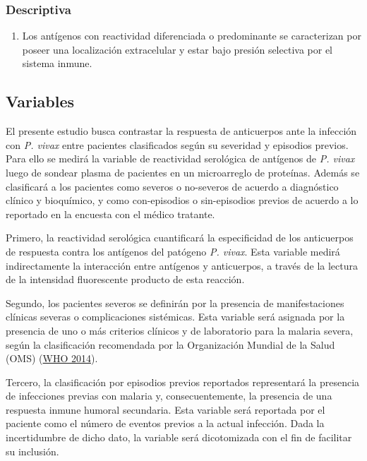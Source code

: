 \documentclass[
  a4paper]{article}
\providecommand{\tightlist}{%
  \setlength{\itemsep}{0pt}\setlength{\parskip}{0pt}}
\begin{document}
\hypertarget{descriptiva}{%
\subsubsection{Descriptiva}\label{descriptiva}}

\begin{enumerate}
\def\labelenumi{\arabic{enumi}.}
\setcounter{enumi}{2}
\tightlist
\item
  Los antígenos con reactividad diferenciada o predominante se
  caracterizan por poseer una localización extracelular y estar bajo
  presión selectiva por el sistema inmune.
\end{enumerate}

\hypertarget{variables}{%
\subsection{Variables}\label{variables}}

El presente estudio busca contrastar la respuesta de anticuerpos ante la
infección con \emph{P. vivax} entre pacientes clasificados según su
severidad y episodios previos. Para ello se medirá la variable de
reactividad serológica de antígenos de \emph{P. vivax} luego de sondear
plasma de pacientes en un microarreglo de proteínas. Además se
clasificará a los pacientes como severos o no-severos de acuerdo a
diagnóstico clínico y bioquímico, y como con-episodios o sin-episodios
previos de acuerdo a lo reportado en la encuesta con el médico tratante.

Primero, la reactividad serológica cuantificará la especificidad de los
anticuerpos de respuesta contra los antígenos del patógeno \emph{P.
vivax}. Esta variable medirá indirectamente la interacción entre
antígenos y anticuerpos, a través de la lectura de la intensidad
fluorescente producto de esta reacción.

Segundo, los pacientes severos se definirán por la presencia de
manifestaciones clínicas severas o complicaciones sistémicas. Esta
variable será asignada por la presencia de uno o más criterios clínicos
y de laboratorio para la malaria severa, según la clasificación
recomendada por la Organización Mundial de la Salud (OMS)
(\protect\hyperlink{ref-WHO2014severe}{WHO 2014}).

Tercero, la clasificación por episodios previos reportados representará
la presencia de infecciones previas con malaria y, consecuentemente, la
presencia de una respuesta inmune humoral secundaria. Esta variable será
reportada por el paciente como el número de eventos previos a la actual
infección. Dada la incertidumbre de dicho dato, la variable será
dicotomizada con el fin de facilitar su inclusión.
\end{document}
